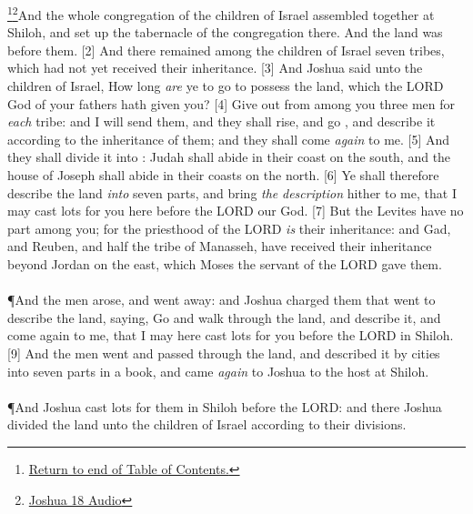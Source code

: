 \footnote{\textcolor[cmyk]{0.99998,1,0,0}{\hyperlink{TOC}{Return to end of Table of Contents.}}}\footnote{\href{https://audiobible.com/bible/joshua_18.html}{\textcolor[cmyk]{0.99998,1,0,0}{Joshua 18 Audio}}}\textcolor[cmyk]{0.99998,1,0,0}{And the whole congregation of the children of Israel assembled together at Shiloh, and set up the tabernacle of the congregation there. And the land was  before them.}
[2] \textcolor[cmyk]{0.99998,1,0,0}{And there remained among the children of Israel seven tribes, which had not yet received their inheritance.}
[3] \textcolor[cmyk]{0.99998,1,0,0}{And Joshua said unto the children of Israel, How long \emph{are} ye  to go to possess the land, which the LORD God of your fathers hath given you?}
[4] \textcolor[cmyk]{0.99998,1,0,0}{Give out from among you three men for \emph{each} tribe: and I will send them, and they shall rise, and go , and describe it according to the inheritance of them; and they shall come \emph{again} to me.}
[5] \textcolor[cmyk]{0.99998,1,0,0}{And they shall divide it into : Judah shall abide in their coast on the south, and the house of Joseph shall abide in their coasts on the north.}
[6] \textcolor[cmyk]{0.99998,1,0,0}{Ye shall therefore describe the land \emph{into} seven parts, and bring \emph{the} \emph{description} hither to me, that I may cast lots for you here before the LORD our God.}
[7] \textcolor[cmyk]{0.99998,1,0,0}{But the Levites have no part among you; for the priesthood of the LORD \emph{is} their inheritance: and Gad, and Reuben, and half the tribe of Manasseh, have received their inheritance beyond Jordan on the east, which Moses the servant of the LORD gave them.}\\
\\
\P \textcolor[cmyk]{0.99998,1,0,0}{And the men arose, and went away: and Joshua charged them that went to describe the land, saying, Go and walk through the land, and describe it, and come again to me, that I may here cast lots for you before the LORD in Shiloh.}
[9] \textcolor[cmyk]{0.99998,1,0,0}{And the men went and passed through the land, and described it by cities into seven parts in a book, and came \emph{again} to Joshua to the host at Shiloh.}\\
\\
\P \textcolor[cmyk]{0.99998,1,0,0}{And Joshua cast lots for them in Shiloh before the LORD: and there Joshua divided the land unto the children of Israel according to their divisions.}\\
